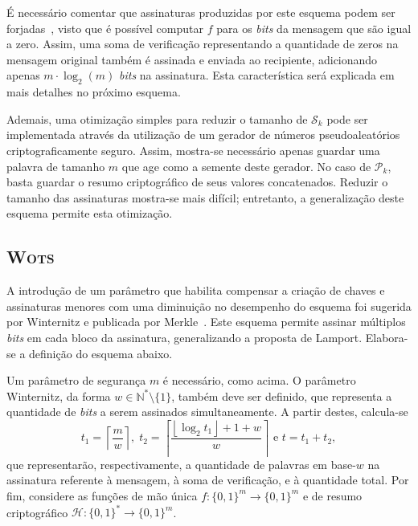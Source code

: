 \documentclass{ufsctex/ufsctex}
\newcommand{\hh}{\mathcal{H}}
\newcommand{\pk}{\mathcal{P}_k}
\newcommand{\sk}{\mathcal{S}_k}
\newcommand{\binwds}[1]{\{0, 1\}^{#1}}
\newcommand{\fhash}[1]{\hh{}: \binwds{*} \longrightarrow{} \binwds{#1}}
\newcommand{\wots}{\textsc{Wots}}
\begin{document}
É necessário comentar que assinaturas produzidas por este esquema podem ser
forjadas~\cite[Capítulo 3]{Merkle:inproc:1989:aug}, visto que é possível
computar $f$ para os \emph{bits} da mensagem que são igual a zero. Assim, uma
soma de verificação representando a quantidade de zeros na mensagem original
também é assinada e enviada ao recipiente, adicionando apenas $m \cdot
\log_2(m)$ \emph{bits} na assinatura. Esta característica será explicada em
mais detalhes no próximo esquema.

Ademais, uma otimização simples para reduzir o tamanho de $\sk{}$ pode
ser implementada através da utilização de um gerador de números
pseudoaleatórios criptograficamente seguro. Assim, mostra-se necessário apenas
guardar uma palavra de tamanho $m$ que age como a semente deste gerador. No
caso de $\pk{}$, basta guardar o resumo criptográfico de seus valores
concatenados. Reduzir o tamanho das assinaturas mostra-se mais difícil;
entretanto, a generalização deste esquema permite esta otimização.

\subsection{\wots{}}\label{subsection:wots}

A introdução de um parâmetro que habilita compensar a criação de chaves e
assinaturas menores com uma diminuição no desempenho do esquema foi sugerida
por Winternitz e publicada por Merkle~\cite[Capítulo
5]{Merkle:inproc:1989:aug}. Este esquema permite assinar múltiplos \emph{bits}
em cada bloco da assinatura, generalizando a proposta de Lamport. Elabora-se a
definição do esquema abaixo.

Um parâmetro de segurança $m$ é necessário, como acima. O parâmetro Winternitz,
da forma $w \in \mathbb{N}^{*}\setminus\{1\}$, também deve ser definido, que
representa a quantidade de \emph{bits} a serem assinados simultaneamente.  A
partir destes, calcula-se \[t_1 = \left\lceil \frac{m}{w} \right\rceil, \; t_2
= \left\lceil \frac{\left\lfloor \log_2 t_1 \right\rfloor + 1 + w}{w}
\right\rceil \text{ e } t = t_1 + t_2,\] que representarão, respectivamente, a
quantidade de palavras em base-$w$ na assinatura referente à mensagem, à soma
de verificação, e à quantidade total.  Por fim, considere as funções de mão
única $f : \binwds{m} \longrightarrow \binwds{m}$ e de resumo criptográfico
$\fhash{m}$.
\end{document}
